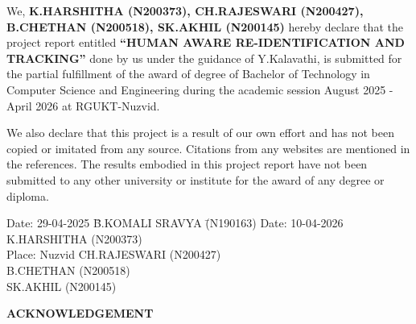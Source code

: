 \documentclass{report}
\begin{document}
\noindent
\normalsize{We, \textbf{K.HARSHITHA (N200373), CH.RAJESWARI (N200427),\vspace{3pt} B.CHETHAN (N200518), SK.AKHIL (N200145)} hereby declare that the project report entitled \textbf{``HUMAN AWARE RE-IDENTIFICATION AND TRACKING''} done by us under the guidance of Y.Kalavathi, is submitted\vspace{3pt} for the partial fulfillment of the award of degree of Bachelor of Technology in Computer Science and\vspace{3pt} Engineering during the academic session August 2025 - April 2026 at RGUKT-Nuzvid.

We also declare that this project is a result of our own effort and has not been copied or imitated from\vspace{3pt} any source. Citations from any websites are mentioned in the references. The results embodied in this\vspace{3pt} project report have not been submitted to any other university or institute for the award of any degree\vspace{3pt} or diploma.}

\vspace{0.2in}
    \noindent
    \large

\begin{tabbing}
Date: 29-04-2025 \hspace{1.6in} \= B.KOMALI SRAVYA \hspace{0.5in} \= (N190163) \kill
Date: 10-04-2026 \>K.HARSHITHA \> (N200373) \\
Place: Nuzvid \> CH.RAJESWARI \> (N200427) \\
\> B.CHETHAN \> (N200518) \\
\> SK.AKHIL \> (N200145) \\
\end{tabbing}
    \vspace{0.2in}

\newpage

\begin{center}
    \textbf{\Large {ACKNOWLEDGEMENT}}\\[20pt]
\end{center}
\end{document}
